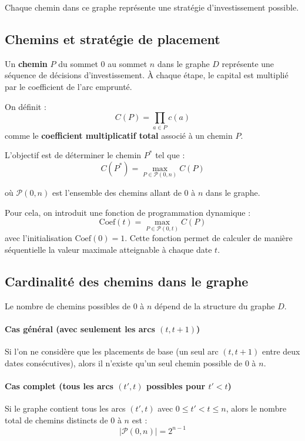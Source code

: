 \documentclass[a4paper,11pt]{article}
\begin{document}
    Chaque chemin dans ce graphe représente une stratégie d’investissement possible.


    \subsection{Chemins et stratégie de placement}

    Un \textbf{chemin} $P$ du sommet $0$ au sommet $n$ dans le graphe $D$ représente une séquence de décisions d’investissement. À chaque étape, le capital est multiplié par le coefficient de l’arc emprunté.

    On définit :
    \[
    C(P) = \prod_{a \in P} c(a)
    \]
    \indent comme le \textbf{coefficient multiplicatif total} associé à un chemin $P$.

    L’objectif est de déterminer le chemin $P^*$ tel que :
    \[
    C(P^*) = \max_{P \in \mathcal{P}(0, n)} C(P)
    \]

    où $\mathcal{P}(0, n)$ est l’ensemble des chemins allant de 0 à $n$ dans le graphe.

    Pour cela, on introduit une fonction de programmation dynamique :
    \[
    \text{Coef}(t) = \max_{P \in \mathcal{P}(0, t)} C(P)
    \]
    avec l’initialisation $\text{Coef}(0) = 1$. Cette fonction permet de calculer de manière séquentielle la valeur maximale atteignable à chaque date $t$.

    \subsection{Cardinalité des chemins dans le graphe}

    Le nombre de chemins possibles de 0 à $n$ dépend de la structure du graphe $D$.

    \paragraph{Cas général (avec seulement les arcs $(t, t+1)$)} 
    Si l’on ne considère que les placements de base (un seul arc $(t, t+1)$ entre deux dates consécutives), alors il n’existe qu’un seul chemin possible de 0 à $n$.

    \paragraph{Cas complet (tous les arcs $(t', t)$ possibles pour $t' < t$)} 
    Si le graphe contient tous les arcs $(t', t)$ avec $0 \leq t' < t \leq n$, alors le nombre total de chemins distincts de $0$ à $n$ est :
    \[
    |\mathcal{P}(0, n)| = 2^{n-1}
    \]
\end{document}
